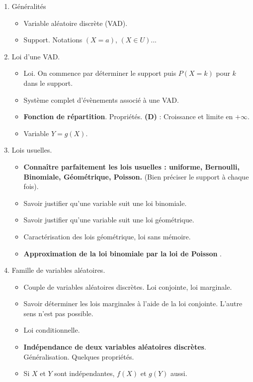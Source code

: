 \documentclass[twoside,a4paper,french,10pt]{VcCours}
\begin{document}
  \begin{enumerate}
  \item Généralités 
  \begin{itemize}
  \item Variable aléatoire discrète (VAD).
  \item Support. Notations $(X=a)$, $(X \in U)$...
  \end{itemize}
  \item Loi d'une VAD.
  \begin{itemize}
  \item Loi. On commence par déterminer le support puis $P(X=k)$ pour $k$ dans le support.
  \item Système complet d'évènements associé à une VAD.
  \item \textbf{Fonction de répartition}. Propriétés. \textbf{(D)} : Croissance et limite en $+ \infty$.
  \item Variable $Y=g(X)$.
  \end{itemize}
  \item Lois usuelles.
  \begin{itemize}
  \item \textbf{Connaître parfaitement les lois usuelles : uniforme, Bernoulli, Binomiale, Géométrique, Poisson.} (Bien préciser le support à chaque fois).
  \item Savoir justifier qu'une variable suit une loi binomiale.
  \item Savoir justifier qu'une variable suit une loi géométrique.
  \item Caractérisation des lois géométrique, loi sans mémoire.
  \item \textbf{Approximation de la loi binomiale par la loi de Poisson%
  }.
  \end{itemize}
  \item Famille de variables aléatoires.
  \begin{itemize}
  \item Couple de variables aléatoires discrètes. Loi conjointe, loi marginale.
  \item Savoir déterminer les lois marginales à l'aide de la loi conjointe. L'autre sens n'est pas possible.
  \item Loi conditionnelle.
  \item \textbf{Indépendance de deux variables aléatoires discrètes}. Généralisation. Quelques propriétés.
  \item Si $X$ et $Y$ sont indépendantes, $f(X)$ et $g(Y)$ aussi.
  \end{itemize}

\end{enumerate}
\end{document}
